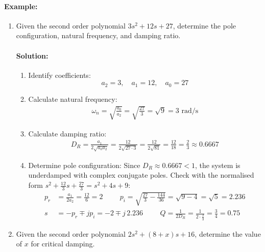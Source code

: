 \paragraph{Example:}
\begin{enumerate}
  \item Given the second order polynomial \( 3s^2 + 12s + 27 \),
  determine the pole configuration, natural frequency, and
  damping ratio.
  \paragraph{Solution:}
  \begin{enumerate}
    \item Identify coefficients:
      \[ a_2 = 3, \quad a_1 = 12, \quad a_0 = 27 \]
    \item Calculate natural frequency:
      \begin{align*}
        \omega_n = \sqrt{\frac{a_0}{a_2}} = \sqrt{\frac{27}{3}} = \sqrt{9} = 3 \text{ rad/s}
      \end{align*}
    \item Calculate damping ratio:
      \begin{align*}
        D_R = \frac{a_1}{2\sqrt{a_0 a_2}} = \frac{12}{2\sqrt{27 \cdot 3}} = \frac{12}{2\sqrt{81}} = \frac{12}{18} = \frac{2}{3} \approx 0.6667
      \end{align*}
    \item Determine pole configuration:
      Since \( D_R \approx 0.6667 < 1 \), the system is underdamped with
      complex conjugate poles. Check with the normalised form
      \(s^2 + \frac{12}{3}s + \frac{27}{3} = s^2 + 4s + 9\):
      \begin{align*}
        p_r &= \frac{a_1}{2a_2} = \frac{12}{6} = 2 \hspace{1cm}
        p_i = \sqrt{\frac{27}{3} - \frac{144}{36}} = \sqrt{9 - 4} = \sqrt{5} = 2.236 \\
        s &= -p_r \mp j p_i = -2 \mp j\,2.236 \hspace{1cm}
        Q = \frac{1}{2D_R} = \frac{1}{2 \cdot \frac{2}{3}} = \frac{3}{4} = 0.75
      \end{align*}
  \end{enumerate}
  \item Given the second order polynomial \( 2s^2 + (8 + x)s + 16 \),
  determine the value of \( x \) for critical damping.

\end{enumerate}
